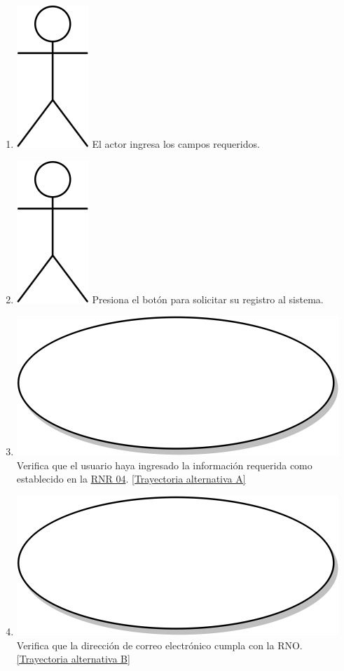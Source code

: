 \begin{enumerate}
  \item {\includegraphics[scale=.1]{Capitulo3/img/actor.png} El actor ingresa los campos requeridos.}
  \item {\includegraphics[scale=.1]{Capitulo3/img/actor.png} Presiona el botón para solicitar su registro al sistema.}
  \item {\includegraphics[scale=.05]{Capitulo3/img/proceso.png} Verifica que el usuario haya ingresado la información requerida como establecido en la \hyperref[rnr_04]{RNR 04}. \hyperref[cu2_ta_a]{[Trayectoria alternativa A]}}
  \item {\includegraphics[scale=.05]{Capitulo3/img/proceso.png} Verifica que la dirección de correo electrónico cumpla con la RNO. \hyperref[cu2_ta_b]{[Trayectoria alternativa B]}}

\end{enumerate}
